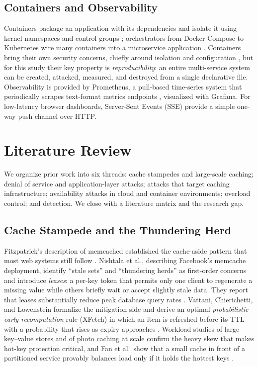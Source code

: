 \documentclass[preprint,12pt]{elsarticle}
\begin{document}
\subsection{Containers and Observability}
\label{sec:bg-containers}
Containers package an application with its dependencies and isolate it using kernel
namespaces and control groups \cite{merkel2014,pahl2015}; orchestrators from Docker
Compose \cite{dockercompose} to Kubernetes \cite{burns2016} wire many containers into
a microservice application \cite{dragoni2017}. Containers bring their own security
concerns, chiefly around isolation and configuration \cite{combe2016,sultan2019}, but
for this study their key property is \emph{reproducibility}: an entire multi-service
system can be created, attacked, measured, and destroyed from a single declarative
file. Observability is provided by Prometheus, a pull-based time-series system that
periodically scrapes text-format metrics endpoints \cite{brazil2018}, visualized with
Grafana. For low-latency browser dashboards, Server-Sent Events (SSE) provide a simple
one-way push channel over HTTP.

\section{Literature Review}
\label{sec:related}

We organize prior work into six threads: cache stampedes and large-scale caching;
denial of service and application-layer attacks; attacks that target caching
infrastructure; availability attacks in cloud and container environments; overload
control; and detection. We close with a literature matrix and the research gap.

\subsection{Cache Stampede and the Thundering Herd}
Fitzpatrick's description of memcached established the cache-aside pattern that most
web systems still follow \cite{fitzpatrick2004}. Nishtala et al., describing
Facebook's memcache deployment, identify ``stale sets'' and ``thundering herds'' as
first-order concerns and introduce \emph{leases}: a per-key token that permits only
one client to regenerate a missing value while others briefly wait or accept slightly
stale data. They report that leases substantially reduce peak database query rates
\cite{nishtala2013}. Vattani, Chierichetti, and Lowenstein formalize the mitigation
side and derive an optimal \emph{probabilistic early recomputation} rule (XFetch) in
which an item is refreshed before its TTL with a probability that rises as expiry
approaches \cite{vattani2015}. Workload studies of large key--value stores
\cite{atikoglu2012} and of photo caching at scale \cite{huang2013} confirm the
heavy skew that makes hot-key protection critical, and Fan et al.\ show that a small
cache in front of a partitioned service provably balances load only if it holds the
hottest keys \cite{fan2011}.
\end{document}
